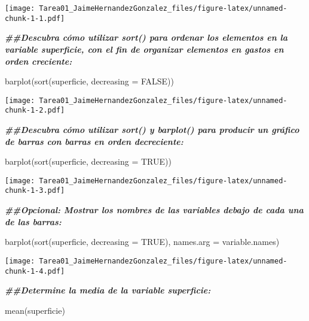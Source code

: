 \documentclass[
]{article}
\newenvironment{Shaded}{\begin{snugshade}}{\end{snugshade}}
\newcommand{\AttributeTok}[1]{\textcolor[rgb]{0.77,0.63,0.00}{#1}}
\newcommand{\ConstantTok}[1]{\textcolor[rgb]{0.00,0.00,0.00}{#1}}
\newcommand{\DocumentationTok}[1]{\textcolor[rgb]{0.56,0.35,0.01}{\textbf{\textit{#1}}}}
\newcommand{\FunctionTok}[1]{\textcolor[rgb]{0.00,0.00,0.00}{#1}}
\newcommand{\NormalTok}[1]{#1}
\begin{document}
\texttt{[image: Tarea01\_JaimeHernandezGonzalez\_files/figure-latex/unnamed-chunk-1-1.pdf]}

\begin{Shaded}
\begin{Highlighting}[]
\DocumentationTok{\#\#Descubra cómo utilizar sort() para ordenar los elementos en la variable superficie, con el fin de organizar elementos en gastos en orden creciente:}

\FunctionTok{barplot}\NormalTok{(}\FunctionTok{sort}\NormalTok{(superficie, }\AttributeTok{decreasing =} \ConstantTok{FALSE}\NormalTok{))}
\end{Highlighting}
\end{Shaded}

\texttt{[image: Tarea01\_JaimeHernandezGonzalez\_files/figure-latex/unnamed-chunk-1-2.pdf]}

\begin{Shaded}
\begin{Highlighting}[]
\DocumentationTok{\#\#Descubra cómo utilizar sort() y barplot() para producir un gráfico de barras con barras en orden decreciente:}

\FunctionTok{barplot}\NormalTok{(}\FunctionTok{sort}\NormalTok{(superficie, }\AttributeTok{decreasing =} \ConstantTok{TRUE}\NormalTok{))}
\end{Highlighting}
\end{Shaded}

\texttt{[image: Tarea01\_JaimeHernandezGonzalez\_files/figure-latex/unnamed-chunk-1-3.pdf]}

\begin{Shaded}
\begin{Highlighting}[]
\DocumentationTok{\#\#Opcional: Mostrar los nombres de las variables debajo de cada una de las barras:}

\FunctionTok{barplot}\NormalTok{(}\FunctionTok{sort}\NormalTok{(superficie, }\AttributeTok{decreasing =} \ConstantTok{TRUE}\NormalTok{), }\AttributeTok{names.arg =}\NormalTok{ variable.names)}
\end{Highlighting}
\end{Shaded}

\texttt{[image: Tarea01\_JaimeHernandezGonzalez\_files/figure-latex/unnamed-chunk-1-4.pdf]}

\begin{Shaded}
\begin{Highlighting}[]
\DocumentationTok{\#\#Determine la media de la variable superficie:}

\FunctionTok{mean}\NormalTok{(superficie)}
\end{Highlighting}
\end{Shaded}
\end{document}
